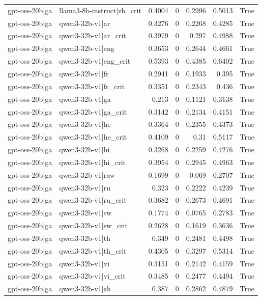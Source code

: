 \begin{table}
\begin{tabular}{l l r r r r l}
gpt-oss-20b|ga & llama3-8b-instruct|zh_crit & 0.4004 & 0 & 0.2996 & 0.5013 & True \\
gpt-oss-20b|ga & qwen3-32b-v1|ar & 0.3276 & 0 & 0.2268 & 0.4285 & True \\
gpt-oss-20b|ga & qwen3-32b-v1|ar_crit & 0.3979 & 0 & 0.297 & 0.4988 & True \\
gpt-oss-20b|ga & qwen3-32b-v1|eng & 0.3653 & 0 & 0.2644 & 0.4661 & True \\
gpt-oss-20b|ga & qwen3-32b-v1|eng_crit & 0.5393 & 0 & 0.4385 & 0.6402 & True \\
gpt-oss-20b|ga & qwen3-32b-v1|fr & 0.2941 & 0 & 0.1933 & 0.395 & True \\
gpt-oss-20b|ga & qwen3-32b-v1|fr_crit & 0.3351 & 0 & 0.2343 & 0.436 & True \\
gpt-oss-20b|ga & qwen3-32b-v1|ga & 0.213 & 0 & 0.1121 & 0.3138 & True \\
gpt-oss-20b|ga & qwen3-32b-v1|ga_crit & 0.3142 & 0 & 0.2134 & 0.4151 & True \\
gpt-oss-20b|ga & qwen3-32b-v1|he & 0.3364 & 0 & 0.2355 & 0.4373 & True \\
gpt-oss-20b|ga & qwen3-32b-v1|he_crit & 0.4109 & 0 & 0.31 & 0.5117 & True \\
gpt-oss-20b|ga & qwen3-32b-v1|hi & 0.3268 & 0 & 0.2259 & 0.4276 & True \\
gpt-oss-20b|ga & qwen3-32b-v1|hi_crit & 0.3954 & 0 & 0.2945 & 0.4963 & True \\
gpt-oss-20b|ga & qwen3-32b-v1|raw & 0.1699 & 0 & 0.069 & 0.2707 & True \\
gpt-oss-20b|ga & qwen3-32b-v1|ru & 0.323 & 0 & 0.2222 & 0.4239 & True \\
gpt-oss-20b|ga & qwen3-32b-v1|ru_crit & 0.3682 & 0 & 0.2673 & 0.4691 & True \\
gpt-oss-20b|ga & qwen3-32b-v1|sw & 0.1774 & 0 & 0.0765 & 0.2783 & True \\
gpt-oss-20b|ga & qwen3-32b-v1|sw_crit & 0.2628 & 0 & 0.1619 & 0.3636 & True \\
gpt-oss-20b|ga & qwen3-32b-v1|th & 0.349 & 0 & 0.2481 & 0.4498 & True \\
gpt-oss-20b|ga & qwen3-32b-v1|th_crit & 0.4305 & 0 & 0.3297 & 0.5314 & True \\
gpt-oss-20b|ga & qwen3-32b-v1|vi & 0.3151 & 0 & 0.2142 & 0.4159 & True \\
gpt-oss-20b|ga & qwen3-32b-v1|vi_crit & 0.3485 & 0 & 0.2477 & 0.4494 & True \\
gpt-oss-20b|ga & qwen3-32b-v1|zh & 0.387 & 0 & 0.2862 & 0.4879 & True \\

\end{tabular}
\end{table}
